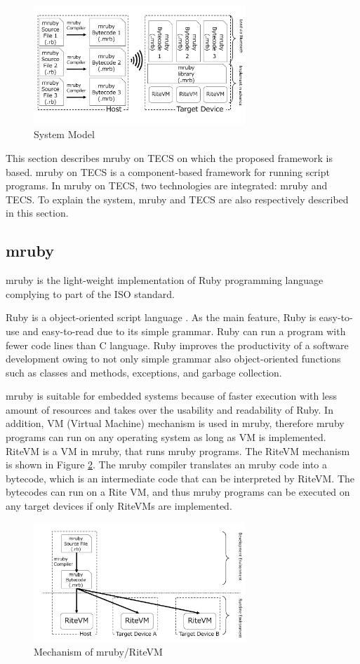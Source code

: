 \documentclass[conference,compsoc]{IEEEtran}
\begin{document}
\begin{figure}[t]
    \centering
    \includegraphics[width=8cm,clip]{figure/proposed.pdf}
    \caption{System Model}
    \label{fig:proposed}
\end{figure}

This section describes mruby on TECS on which the proposed framework is based.
mruby on TECS is a component-based framework for running script programs.
In mruby on TECS, two technologies are integrated: mruby and TECS.
To explain the system, mruby and TECS are also respectively described in this section.

\subsection{mruby}
\label{sec:mruby}
mruby is the light-weight implementation of Ruby programming language complying to part of the ISO standard.

Ruby is a object-oriented script language \cite{url:Ruby}.
As the main feature, Ruby is easy-to-use and easy-to-read due to its simple grammar.
Ruby can run a program with fewer code lines than C language.
Ruby improves the productivity of a software development owing to not only simple grammar also object-oriented functions such as classes and methods, exceptions, and garbage collection.

mruby is suitable for embedded systems because of faster execution with less amount of resources and takes over the usability and readability of Ruby.
In addition, VM (Virtual Machine) mechanism is used in mruby, therefore mruby programs can run on any operating system as long as VM is implemented.
RiteVM is a VM in mruby, that runs mruby programs.
The RiteVM mechanism is shown in Figure \ref{fig:mruby}.
The mruby compiler translates an mruby code into a bytecode, which is an intermediate code that can be interpreted by RiteVM.
The bytecodes can run on a Rite VM, and thus mruby programs can be executed on any target devices if only RiteVMs are implemented.
\begin{figure}[t]
    \centering
    \includegraphics[width=8cm,clip]{figure/mruby.pdf}
    \caption{Mechanism of mruby/RiteVM}
    \label{fig:mruby}
\end{figure}
\end{document}
